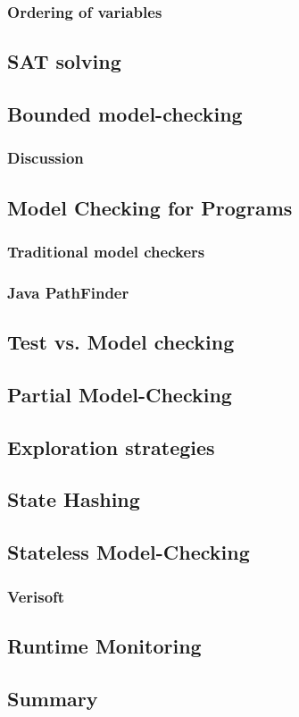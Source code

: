 \documentclass[12pt, a4paper]{book}
\begin{document}
  \subsubsection{Ordering of variables}
  \label{subs:Ordering of variables}
  \subsection{SAT solving}
  \label{sub:SAT solving}
  \subsection{Bounded model-checking}
  \label{sub:Bounded model-checking}
  \subsubsection{Discussion}
  \label{subs:Discussion}
  \subsection{Model Checking for Programs}
  \label{sub:Model Checking for Programs}
  \subsubsection{Traditional model checkers}
  \label{subs:Traditional model checkers}
  \subsubsection{Java PathFinder}
  \label{subs:Java PathFinder}
  \subsection{Test vs. Model checking}
  \label{sub:Test vs. Model checking}
  \subsection{Partial Model-Checking}
  \label{sub:Partial Model-Checking}
  \subsection{Exploration strategies}
  \label{sub:Exploration strategies}
  \subsection{State Hashing}
  \label{sub:State Hashing}
  \subsection{Stateless Model-Checking}
  \label{sub:Stateless Model-Checking}
  \subsubsection{Verisoft}
  \label{subs:Verisoft}
  \subsection{Runtime Monitoring}
  \label{sub:Runtime Monitoring}
  \subsection{Summary}
  \label{sub:Summary}
\end{document}
